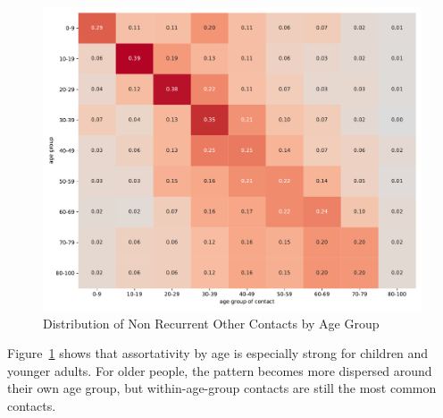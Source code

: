 \begin{figure}[ht]
    \centering
    \includegraphics[width=0.9 \textwidth]{figures/results/figures/data/assortativity_other_non_recurrent}
    \caption{Distribution of Non Recurrent Other Contacts by Age Group}
    \label{fig:assortativity_other}
\end{figure}


Figure~\ref{fig:assortativity_other} shows that assortativity by age is especially strong
for children and younger adults. For older people, the pattern becomes more dispersed
around their own age group, but within-age-group contacts are still the most common
contacts.

